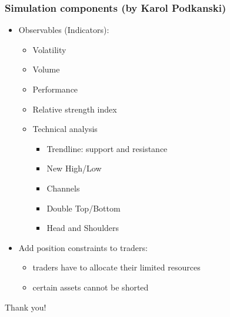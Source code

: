 \documentclass{beamer}
\begin{document}
\begin{frame}
\frametitle{Simulation components (by Karol Podkanski)}
\begin{itemize}
    \item Observables (Indicators):
    \begin{itemize}
      \item Volatility
      \item Volume
      \item Performance
      \item Relative strength index
      \item Technical analysis
      \begin{itemize}
        \item Trendline: support and resistance
        \item New High/Low
        \item Channels
        \item Double Top/Bottom
        \item Head and Shoulders
      \end{itemize}
    \end{itemize}
    \item Add position constraints to traders:
        \begin{itemize}
            \item traders have to allocate their limited resources
            \item certain assets cannot be shorted
        \end{itemize}
\end{itemize}
\end{frame}

\begin{frame}
\Huge{\centerline{Thank you!}}
\end{frame}

\end{document}
